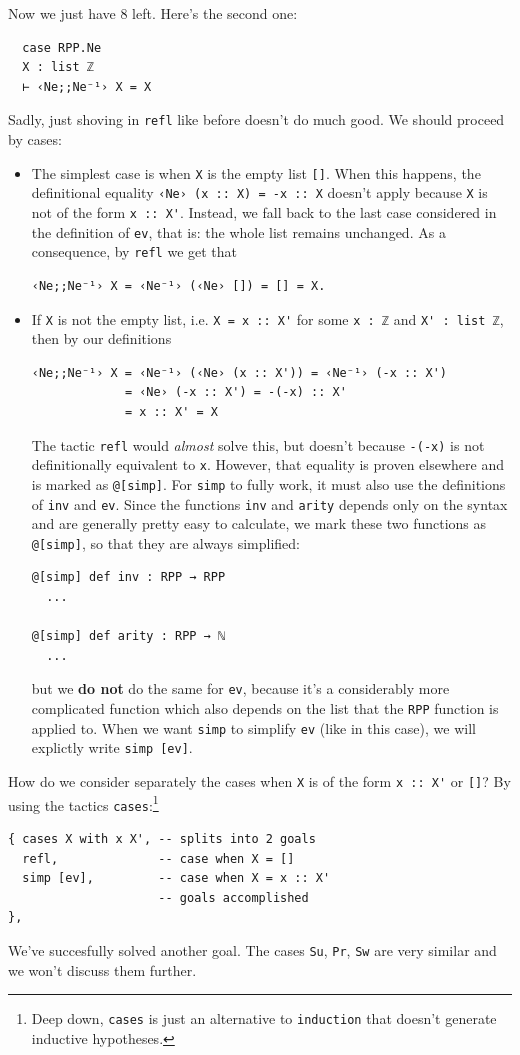 \documentclass{book}
\theoremstyle{definition}
\theoremstyle{remark}
\theoremstyle{plain}
\begin{document}
Now we just have 8 left.
Here's the second one:
\begin{lstlisting}
  case RPP.Ne
  X : list ℤ
  ⊢ ‹Ne;;Ne⁻¹› X = X
\end{lstlisting}
Sadly, just shoving in \lstinline{refl} like before doesn't do much good.
We should proceed by cases:
\begin{itemize}
\item The simplest case is when \lstinline{X} is the empty list \lstinline{[]}.
When this happens, the definitional equality \lstinline{‹Ne› (x :: X) = -x :: X} doesn't apply because \lstinline{X} is not of the form \lstinline{x :: X'}.
Instead, we fall back to the last case considered in the definition of \lstinline{ev}, that is: the whole list remains unchanged.
As a consequence, by \lstinline{refl} we get that
\begin{lstlisting}
‹Ne;;Ne⁻¹› X = ‹Ne⁻¹› (‹Ne› []) = [] = X.
\end{lstlisting}

\item If \lstinline{X} is not the empty list, i.e. \lstinline{X = x :: X'} for some \lstinline{x : ℤ} and \lstinline{X' : list ℤ},
then by our definitions
\begin{lstlisting}
‹Ne;;Ne⁻¹› X = ‹Ne⁻¹› (‹Ne› (x :: X')) = ‹Ne⁻¹› (-x :: X')
             = ‹Ne› (-x :: X') = -(-x) :: X'
             = x :: X' = X
\end{lstlisting}
The tactic \lstinline{refl} would \textit{almost} solve this,
but doesn't because \lstinline{-(-x)} is not definitionally equivalent to \lstinline{x}.
However, that equality is proven elsewhere and is marked as \lstinline{@[simp]}.
For \lstinline{simp} to fully work, it must also use the definitions of \lstinline{inv} and \lstinline{ev}.
Since the functions \lstinline{inv} and \lstinline{arity} depends only on the syntax and are generally pretty easy to calculate,
we mark these two functions as \lstinline{@[simp]}, so that they are always simplified:
\begin{lstlisting}
@[simp] def inv : RPP → RPP
  ...

@[simp] def arity : RPP → ℕ
  ...
\end{lstlisting}
but we \textbf{do not} do the same for \lstinline{ev}, because it's a considerably more complicated function
which also depends on the list that the \lstinline{RPP} function is applied to.
When we want \lstinline{simp} to simplify \lstinline{ev} (like in this case), we will explictly write \lstinline{simp [ev]}.
\end{itemize}
How do we consider separately the cases when \lstinline{X} is of the form \lstinline{x :: X'} or \lstinline{[]}?
By using the tactics
\lstinline{cases}:\footnote{Deep down, \lstinline{cases} is just an alternative to \lstinline{induction} that doesn't generate inductive hypotheses.}
\begin{lstlisting}
{ cases X with x X', -- splits into 2 goals
  refl,              -- case when X = []
  simp [ev],         -- case when X = x :: X'
                     -- goals accomplished
},
\end{lstlisting}
We've succesfully solved another goal.
The cases \lstinline{Su}, \lstinline{Pr}, \lstinline{Sw} are very similar and we won't discuss them further.
\end{document}
